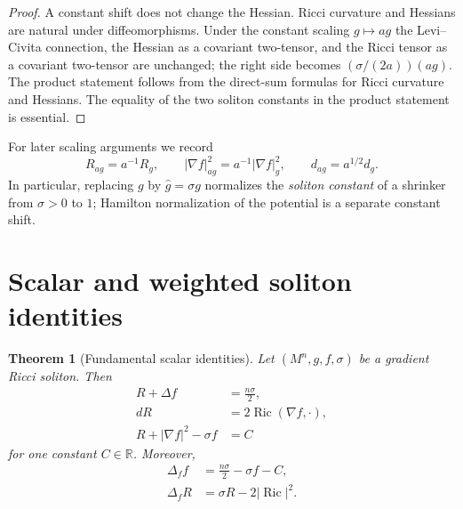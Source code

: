\documentclass[10pt]{coll-l}
\newtheorem{theorem}{Theorem}[chapter]
\theoremstyle{definition}
\theoremstyle{remark}
\numberwithin{section}{chapter}
\numberwithin{equation}{chapter}
\newcommand{\Ric}{\operatorname{Ric}}
\begin{document}
\begin{proof}
A constant shift does not change the Hessian.  Ricci curvature and Hessians
are natural under diffeomorphisms.  Under the constant scaling $g\mapsto ag$
the Levi--Civita connection, the Hessian as a covariant two-tensor, and the
Ricci tensor as a covariant two-tensor are unchanged; the right side becomes
$(\sigma/(2a))(ag)$.  The product statement follows from the direct-sum
formulas for Ricci curvature and Hessians.  The equality of the two soliton
constants in the product statement is essential.
\end{proof}

For later scaling arguments we record
\begin{equation}
 R_{ag}=a^{-1}R_g,\qquad
 |\nabla f|_{ag}^2=a^{-1}|\nabla f|_g^2,\qquad
 d_{ag}=a^{1/2}d_g.                                      \label{eq:sol-scaling-data}
\end{equation}
In particular, replacing $g$ by $\widehat g=\sigma g$ normalizes the
\emph{soliton constant} of a shrinker from $\sigma>0$ to $1$; Hamilton
normalization of the potential is a separate constant shift.

\section{Scalar and weighted soliton identities}
\label{sec:sol-identities}

\begin{theorem}[Fundamental scalar identities]
\label{thm:sol-fundamental-identities}
Let $(M^n,g,f,\sigma)$ be a gradient Ricci soliton.  Then
\begin{align}
 R+\Delta f&=\frac{n\sigma}{2},                            \label{eq:sol-trace}\\
 dR&=2\Ric(\nabla f,\mathord\cdot),                        \label{eq:sol-grad-scalar}\\
 R+|\nabla f|^2-\sigma f&=C                                \label{eq:sol-hamilton-constant}
\end{align}
for one constant $C\in\mathbb R$.  Moreover,
\begin{align}
 \Delta_ff&=\frac{n\sigma}{2}-\sigma f-C,                 \label{eq:sol-drift-potential}\\
 \Delta_fR&=\sigma R-2|\Ric|^2.                           \label{eq:sol-drift-scalar}
\end{align}
\end{theorem}
\end{document}
